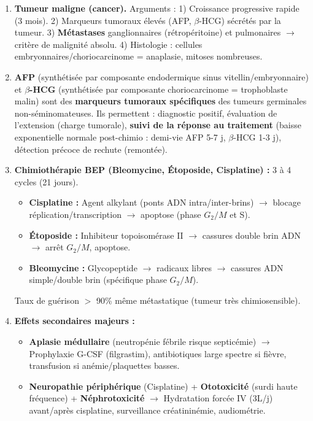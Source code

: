 \documentclass[11pt]{article}
\begin{document}
\begin{corrige}
\begin{enumerate}
    \item \textbf{Tumeur maligne (cancer).} Arguments : 1) Croissance progressive rapide (3 mois). 2) Marqueurs tumoraux élevés (AFP, $\beta$-HCG) sécrétés par la tumeur. 3) \textbf{Métastases} ganglionnaires (rétropéritoine) et pulmonaires $\rightarrow$ critère de malignité absolu. 4) Histologie : cellules embryonnaires/choriocarcinome = anaplasie, mitoses nombreuses.
    \item \textbf{AFP} (synthétisée par composante endodermique sinus vitellin/embryonnaire) et \textbf{$\beta$-HCG} (synthétisée par composante choriocarcinome = trophoblaste malin) sont des \textbf{marqueurs tumoraux spécifiques} des tumeurs germinales non-séminomateuses. Ils permettent : diagnostic positif, évaluation de l'extension (charge tumorale), \textbf{suivi de la réponse au traitement} (baisse exponentielle normale post-chimio : demi-vie AFP 5-7 j, $\beta$-HCG 1-3 j), détection précoce de rechute (remontée).
    \item \textbf{Chimiothérapie BEP (Bleomycine, Étoposide, Cisplatine) :} 3 à 4 cycles (21 jours).
        \begin{itemize}
            \item \textbf{Cisplatine :} Agent alkylant (ponts ADN intra/inter-brins) $\rightarrow$ blocage réplication/transcription $\rightarrow$ apoptose (phase $G_2/M$ et S).
            \item \textbf{Étoposide :} Inhibiteur topoisomérase II $\rightarrow$ cassures double brin ADN $\rightarrow$ arrêt $G_2/M$, apoptose.
            \item \textbf{Bleomycine :} Glycopeptide $\rightarrow$ radicaux libres $\rightarrow$ cassures ADN simple/double brin (spécifique phase $G_2/M$).
        \end{itemize}
        Taux de guérison $>$ 90\% même métastatique (tumeur très chimiosensible).
    \item \textbf{Effets secondaires majeurs :}
        \begin{itemize}
            \item \textbf{Aplasie médullaire} (neutropénie fébrile risque septicémie) $\rightarrow$ Prophylaxie G-CSF (filgrastim), antibiotiques large spectre si fièvre, transfusion si anémie/plaquettes basses.
            \item \textbf{Neuropathie périphérique} (Cisplatine) + \textbf{Ototoxicité} (surdi haute fréquence) + \textbf{Néphrotoxicité} $\rightarrow$ Hydratation forcée IV (3L/j) avant/après cisplatine, surveillance créatininémie, audiométrie.

\end{itemize}
\end{enumerate}
\end{corrige}
\end{document}

